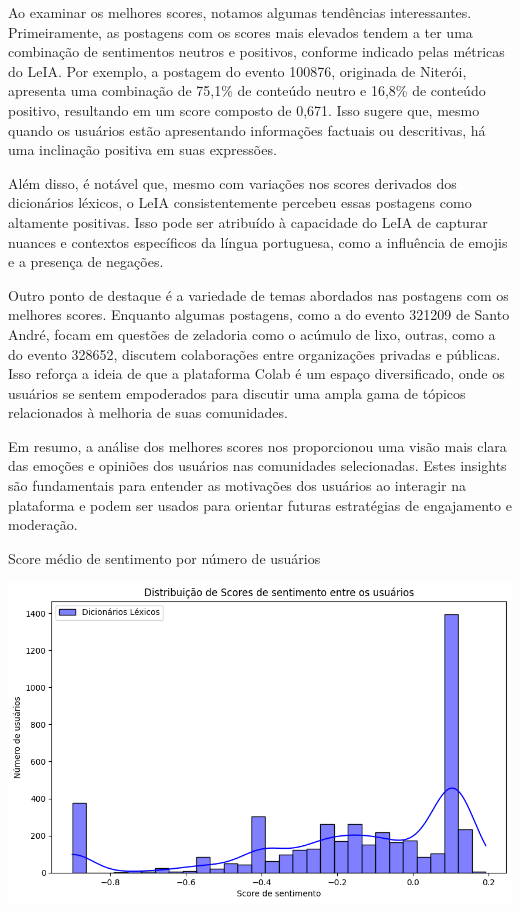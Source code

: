 Ao examinar os melhores scores, notamos algumas tendências interessantes. Primeiramente, as postagens com os scores mais elevados tendem a ter uma combinação de sentimentos neutros e positivos, conforme indicado pelas métricas do LeIA. Por exemplo, a postagem do evento 100876, originada de Niterói, apresenta uma combinação de 75,1\% de conteúdo neutro e 16,8\% de conteúdo positivo, resultando em um score composto de 0,671. Isso sugere que, mesmo quando os usuários estão apresentando informações factuais ou descritivas, há uma inclinação positiva em suas expressões.

Além disso, é notável que, mesmo com variações nos scores derivados dos dicionários léxicos, o LeIA consistentemente percebeu essas postagens como altamente positivas. Isso pode ser atribuído à capacidade do LeIA de capturar nuances e contextos específicos da língua portuguesa, como a influência de emojis e a presença de negações.

Outro ponto de destaque é a variedade de temas abordados nas postagens com os melhores scores. Enquanto algumas postagens, como a do evento 321209 de Santo André, focam em questões de zeladoria como o acúmulo de lixo, outras, como a do evento 328652, discutem colaborações entre organizações privadas e públicas. Isso reforça a ideia de que a plataforma Colab é um espaço diversificado, onde os usuários se sentem empoderados para discutir uma ampla gama de tópicos relacionados à melhoria de suas comunidades.

Em resumo, a análise dos melhores scores nos proporcionou uma visão mais clara das emoções e opiniões dos usuários nas comunidades selecionadas. Estes insights são fundamentais para entender as motivações dos usuários ao interagir na plataforma e podem ser usados para orientar futuras estratégias de engajamento e moderação.

\begin{quadro}[!htb]
	\caption{Score médio de sentimento por número de usuários}
	\label{fig:average_score_by_number_of_users}
	\centering
	\includegraphics[scale=0.70]{images/average_score_by_number_of_users.png}
	\fautor
\end{quadro}

